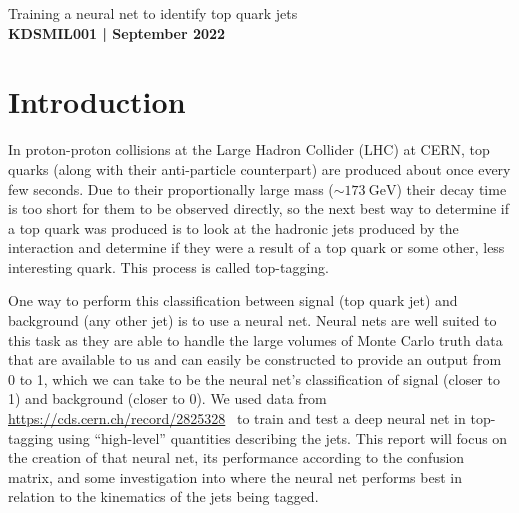 \documentclass[11pt]{article}
\numberwithin{equation}{section}
\numberwithin{figure}{section}
\numberwithin{table}{section}
\begin{document}
\begin{center}
    {\huge Training a neural net to identify top quark jets}\\
    \vspace{0.2in}
    \textbf{KDSMIL001 | September 2022}    
    
    \begin{abstract}
        We train a neural net to identify jets as originating from top quarks as opposed to other quarks; a process known as top tagging. High-level variables describing the jets are used as opposed to constituent data as constituent requires considerably more computing power. The model's performance is then assessed according to some commonly used statistics and investigated for different $p_\mathrm{T}$ cuts.
    \end{abstract}
\end{center}

\section{Introduction}\label{sec:Introduction}
In proton-proton collisions at the Large Hadron Collider (LHC) at CERN, top quarks (along with their anti-particle counterpart) are produced about once every few seconds. Due to their proportionally large mass ($\sim\SI{173}{\giga\electronvolt}$) their decay time is too short for them to be observed directly, so the next best way to determine if a top quark was produced is to look at the hadronic jets produced by the interaction and determine if they were a result of a top quark or some other, less interesting quark. This process is called top-tagging.

One way to perform this classification between signal (top quark jet) and background (any other jet) is to use a neural net. Neural nets are well suited to this task as they are able to handle the large volumes of Monte Carlo truth data that are available to us and can easily be constructed to provide an output from 0 to 1, which we can take to be the neural net's classification of signal (closer to 1) and background (closer to 0). We used data from \url{https://cds.cern.ch/record/2825328}~\cite{top-tagging-data} to train and test a deep neural net in top-tagging using ``high-level'' quantities describing the jets. This report will focus on the creation of that neural net, its performance according to the confusion matrix, and some investigation into where the neural net performs best in relation to the kinematics of the jets being tagged.
\end{document}
